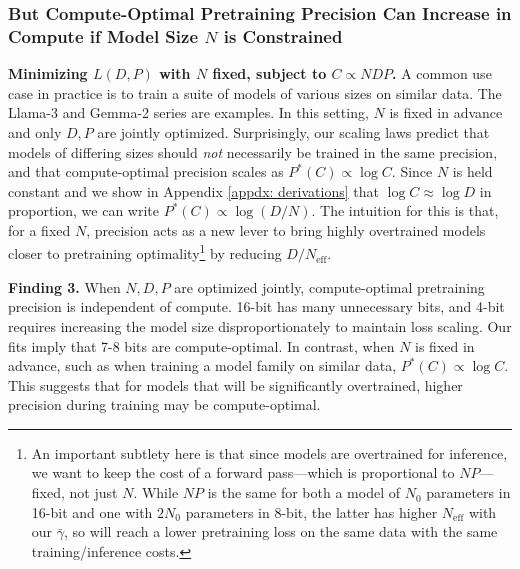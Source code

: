 \documentclass[11pt]{article}
\begin{document}
\subsubsection{But Compute-Optimal Pretraining Precision Can Increase in Compute if Model Size \texorpdfstring{$N$}{N} is Constrained}


\textbf{Minimizing $L(D, P)$ with $N$ fixed, subject to $C \propto NDP$.} A common use case in practice is to train a suite of models of various sizes on similar data. The Llama-3 and Gemma-2 series \citep{dubey2024llama, team2024gemma} are examples. In this setting, $N$ is fixed in advance and only $D, P$ are jointly optimized. Surprisingly, our scaling laws predict that models of differing sizes should \textit{not} necessarily be trained in the same precision, and that compute-optimal precision scales as $P^*(C) \propto \log C$. Since $N$ is held constant and we show in Appendix \ref{appdx: derivations} that $\log C \approx \log D$ in proportion, we can write $P^*(C) \propto \log(D/N)$. The intuition for this is that, for a fixed $N$, precision acts as a new lever to bring highly overtrained models closer to pretraining optimality\footnote{An important subtlety here is that since models are overtrained for inference, we want to keep the cost of a forward pass---which is proportional to $NP$---fixed, not just $N$. While $NP$ is the same for both a model of $N_0$ parameters in 16-bit and one with $2N_0$ parameters in 8-bit, the latter has higher $N_\text{eff}$ with our $\bar{\gamma}$, so will reach a lower pretraining loss on the same data with the same training/inference costs.} by reducing $D/N_\text{eff}$. 
    
\begin{tcolorbox}[colback=lightblue!10, colframe=lightblue!50!black, boxrule=0.5mm, arc=2mm]
    \textbf{Finding 3.} When $N, D, P$ are optimized jointly, compute-optimal pretraining precision is independent of compute. 16-bit has many unnecessary bits, and 4-bit requires increasing the model size disproportionately to maintain loss scaling. Our fits imply that 7-8 bits are compute-optimal. In contrast, when $N$ is fixed in advance, such as when training a model family on similar data, $P^*(C) \propto \log C$. This suggests that for models that will be significantly overtrained, higher precision during training may be compute-optimal.
\end{tcolorbox}
\end{document}
